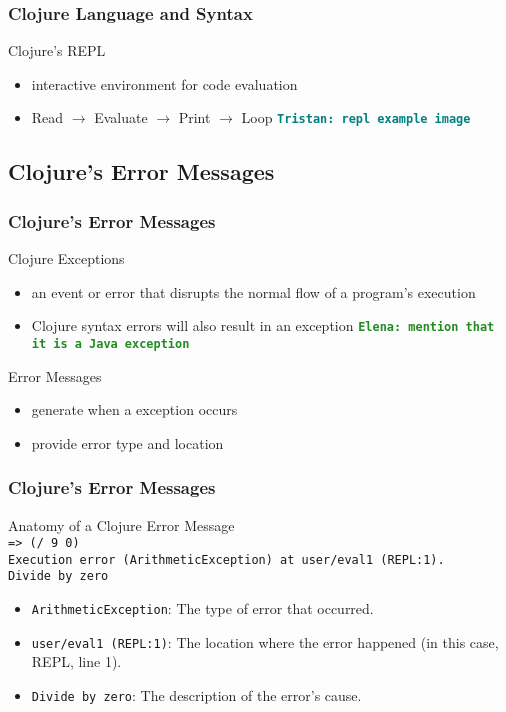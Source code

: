 \documentclass{beamer}
\newcommand{\comment}[1]{{\bf \tt  {#1}}}
\newcommand{\emcomment}[1]{\textcolor{ForestGreen}{\comment{Elena: {#1}}}}
\newcommand{\tkcomment}[1]{\textcolor{Teal}{\comment{Tristan: {#1}}}}
\begin{document}
\begin{frame}
  \frametitle{Clojure Language and Syntax}
  Clojure's REPL
  \begin{itemize}
    \item interactive environment for code evaluation
    \item Read \(\rightarrow\) Evaluate \(\rightarrow\) Print \(\rightarrow\) Loop
    \tkcomment{repl example image}
  \end{itemize}  
\end{frame}

\subsection{Clojure's Error Messages}
\begin{frame}
  \frametitle{Clojure's Error Messages}
  Clojure Exceptions
  \begin{itemize}
    \item an event or error that disrupts the normal flow of a program's execution
    \item Clojure syntax errors will also result in an exception \emcomment{mention that it is a Java exception}
  \end{itemize}
  Error Messages
  \begin{itemize}
    \item generate when a exception occurs
    \item provide error type and location
  \end{itemize}
\end{frame}

\begin{frame}
    \frametitle{Clojure's Error Messages}
    Anatomy of a Clojure Error Message \\
    \texttt{=> (/ 9 0)} \\
    \texttt{Execution error (ArithmeticException) at user/eval1 (REPL:1).} \\
    \texttt{Divide by zero}
    \begin{itemize}
      \item \texttt{ArithmeticException}: The type of error that occurred.
      \item \texttt{user/eval1 (REPL:1)}: The location where the error happened (in this case, REPL, line 1).
      \item \texttt{Divide by zero}: The description of the error's cause.
    \end{itemize}
\end{frame}
\end{document}

